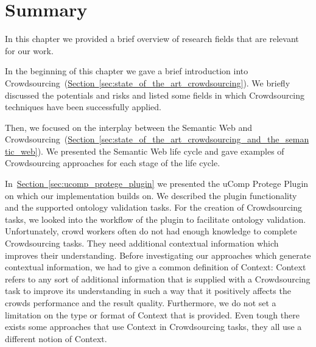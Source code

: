 \section{Summary}\label{sec:state_of_the_art_summary}
In this chapter we provided a brief overview of research fields that are relevant for our work.

In the beginning of this chapter we gave a brief introduction into Crowdsourcing~(\hyperref[sec:state_of_the_art_crowdsourcing]{Section~\ref*{sec:state_of_the_art_crowdsourcing}}). We briefly discussed the potentials and risks and listed some fields in which Crowdsourcing techniques have been successfully applied. 

Then, we focused on the interplay between the Semantic Web and Crowdsourcing~(\hyperref[sec:state_of_the_art_crowdsourcing_and_the_semantic_web]{Section~\ref*{sec:state_of_the_art_crowdsourcing_and_the_semantic_web}}). We presented the Semantic Web life cycle and gave examples of Crowdsourcing approaches for each stage of the life cycle. 

In~\hyperref[sec:ucomp_protege_plugin]{Section~\ref*{sec:ucomp_protege_plugin}} we presented the uComp Protege Plugin on which our implementation builds on. We described the plugin functionality and the supported ontology validation tasks. For the creation of Crowdsourcing tasks, we looked into the workflow of the plugin to facilitate ontology validation. 
Unfortunately, crowd workers often do not had enough knowledge to complete Crowdsourcing tasks. They need additional contextual information which improves their understanding. Before investigating our approaches which generate contextual information, we had to give a common definition of \guillemotright Context\guillemotleft:
Context refers to any sort of additional information that is supplied with a Crowdsourcing task to improve its understanding in
such a way that it positively affects the crowds performance and the result quality. Furthermore, we do not set a limitation on the type or format of Context that is provided. Even tough there exists some approaches that use Context in Crowdsourcing tasks,
they all use a different notion of Context.

